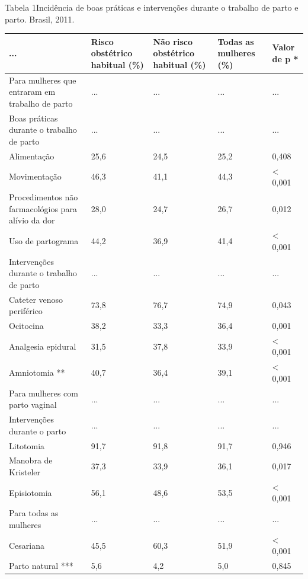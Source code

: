 \documentclass{article}
\begin{document}
Tabela 1Incidência de boas práticas e intervenções durante o trabalho de
parto e parto. Brasil, 2011.
\begin{table}
\begin{xtabular}{ l | l | l | l | l }
\hline... & Risco obstétrico habitual (\%) & Não risco obstétrico habitual (\%) &
Todas as mulheres (\%) & Valor de p *\\ \hline
Para mulheres que entraram em trabalho de parto
& ...
& ...
& ...
& ...
\\ \hline

Boas práticas durante o trabalho de parto
& ...
& ...
& ...
& ...
\\ \hline

Alimentação
& 25,6
& 24,5
& 25,2
& 0,408
\\ \hline

Movimentação
& 46,3
& 41,1
& 44,3
& < 0,001
\\ \hline

Procedimentos não farmacológios para alívio da dor
& 28,0
& 24,7
& 26,7
& 0,012
\\ \hline

Uso de partograma
& 44,2
& 36,9
& 41,4
& < 0,001
\\ \hline

Intervenções durante o trabalho de parto
& ...
& ...
& ...
& ...
\\ \hline

Cateter venoso periférico
& 73,8
& 76,7
& 74,9
& 0,043
\\ \hline

Ocitocina
& 38,2
& 33,3
& 36,4
& 0,001
\\ \hline

Analgesia epidural
& 31,5
& 37,8
& 33,9
& < 0,001
\\ \hline

Amniotomia **
& 40,7
& 36,4
& 39,1
& < 0,001
\\ \hline

Para mulheres com parto vaginal
& ...
& ...
& ...
& ...
\\ \hline

Intervenções durante o parto
& ...
& ...
& ...
& ...
\\ \hline

Litotomia
& 91,7
& 91,8
& 91,7
& 0,946
\\ \hline

Manobra de Kristeler
& 37,3
& 33,9
& 36,1
& 0,017
\\ \hline

Episiotomia
& 56,1
& 48,6
& 53,5
& < 0,001
\\ \hline

Para todas as mulheres
& ...
& ...
& ...
& ...
\\ \hline

Cesariana
& 45,5
& 60,3
& 51,9
& < 0,001
\\ \hline

Parto natural ***
& 5,6
& 4,2
& 5,0
& 0,845
\\ \hline

\end{xtabular}
\end{table}
\end{document}

